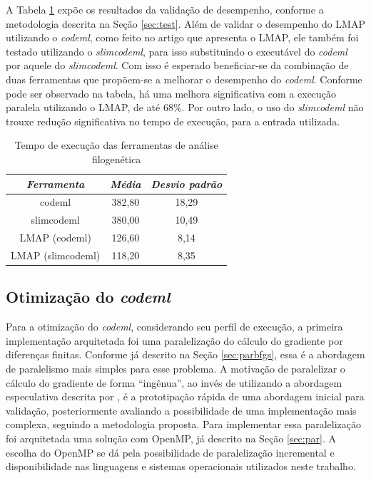 \documentclass[cic,tc]{iiufrgs}
\begin{document}
A Tabela \ref{tbl:paml} expõe os resultados da validação de desempenho,
conforme a metodologia descrita na Seção \ref{sec:test}. Além de validar o
desempenho do LMAP utilizando o \textit{codeml}, como feito no artigo que
apresenta o LMAP, ele também foi testado utilizando o \textit{slimcodeml}, para
isso substituindo o executável do \textit{codeml} por aquele do
\textit{slimcodeml}. Com isso é esperado beneficiar-se da combinação de duas
ferramentas que propõem-se a melhorar o desempenho do \textit{codeml}.
Conforme pode ser observado na tabela, há uma melhora significativa com a
execução paralela utilizando o LMAP, de até 68\%. Por outro lado, o uso do
\textit{slimcodeml} não trouxe redução significativa no tempo de execução, para
a entrada utilizada.

\begin{table}[h]
    \caption{Tempo de execução das ferramentas de análise filogenética}
    \centering
        \begin{tabular}{c|c|c}
          \hline
          \textit{Ferramenta} & \textit{Média} & \textit{Desvio padrão} \\
          \hline
          \hline
          codeml            & 382,80 & 18,29 \\
          slimcodeml        & 380,00 & 10,49 \\
          LMAP (codeml)     & 126,60 & 8,14 \\
          LMAP (slimcodeml) & 118,20 & 8,35  \\
          \hline
        \end{tabular}
    \label{tbl:paml}
\end{table}

\subsection{Otimização do \textit{codeml}}
\label{sec:optcodeml}

Para a otimização do \textit{codeml}, considerando seu perfil de execução, a
primeira implementação arquitetada foi uma paralelização do cálculo do
gradiente por diferenças finitas. Conforme já descrito na Seção
\ref{sec:parbfgs}, essa é a abordagem de paralelismo mais simples para esse
problema. A motivação de paralelizar o cálculo do gradiente de forma
``ingênua'', ao invés de utilizando a abordagem especulativa descrita por
\cite{byrd1988parallel}, é a prototipação rápida de uma abordagem inicial para
validação, posteriormente avaliando a possibilidade de uma implementação mais
complexa, seguindo a metodologia proposta. Para implementar essa paralelização
foi arquitetada uma solução com OpenMP, já descrito na Seção \ref{sec:par}. A
escolha do OpenMP se dá pela possibilidade de paralelização incremental e
disponibilidade nas linguagens e sistemas operacionais utilizados neste
trabalho.
\end{document}
